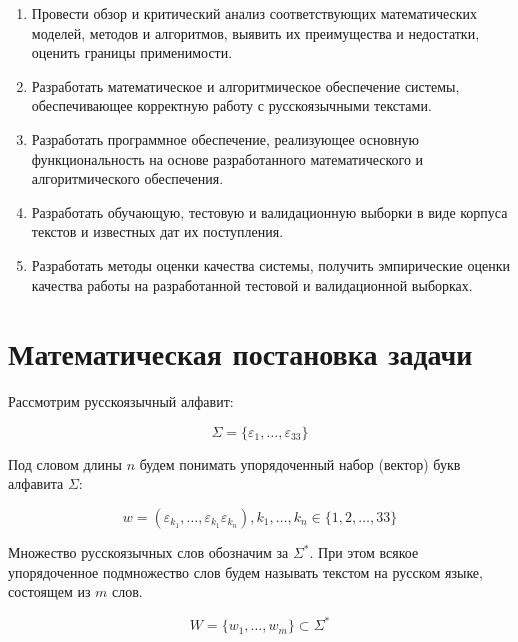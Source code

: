 \documentclass[a4paper,12pt,preview]{report} %
\begin{document}
	\begin{enumerate}
		\item Провести обзор и критический анализ соответствующих математических моделей, методов и алгоритмов, выявить их преимущества и недостатки, оценить границы применимости.
		
		\item Разработать математическое и алгоритмическое обеспечение системы, обеспечивающее корректную работу с русскоязычными текстами.
		
		\item Разработать программное обеспечение, реализующее основную функциональность на основе разработанного математического и алгоритмического обеспечения. 
		
		\item Разработать обучающую, тестовую и валидационную выборки в виде корпуса текстов и известных дат их поступления.
		
		\item Разработать методы оценки качества системы, получить эмпирические оценки качества работы на разработанной тестовой и валидационной выборках. 
	\end{enumerate}
	
	\newpage
	
	\section{Математическая постановка задачи}
	
	Рассмотрим русскоязычный алфавит:
	
	\begin{equation}
	\Sigma = \{ \varepsilon_1, \dots, \varepsilon_{33}  \}
	\end{equation}
	
	Под словом длины $n$ будем понимать упорядоченный набор (вектор) букв алфавита $\Sigma$:
	
	\begin{equation}
	w = (\varepsilon_{k_1}, \dots, \varepsilon_{k_1}\varepsilon_{k_n}), k_1, \dots, k_n \in \{ 1, 2, \dots, 33\}
	\end{equation}
	
	Множество русскоязычных слов обозначим за $\Sigma^\ast$. При этом всякое упорядоченное подмножество слов будем называть текстом на русском языке, состоящем из $m$ слов.
	
	\begin{equation}
	W = \{w_1, \dots, w_m\} \subset \Sigma^\ast
	\end{equation}
	
\end{document}
